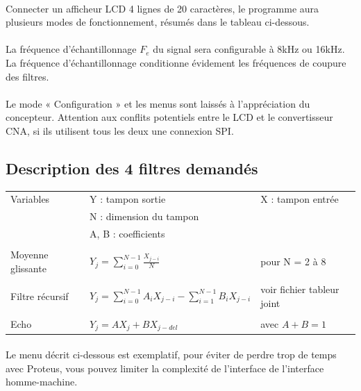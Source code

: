 \documentclass{article}
\begin{document}
    \paragraph{}
    Connecter un afficheur LCD 4 lignes de 20 caractères, le programme aura plusieurs modes de fonctionnement, résumés dans le tableau ci-dessous.

    \paragraph{}
    La fréquence d’échantillonnage $F_e$ du signal sera configurable à 8kHz ou 16kHz. La fréquence d’échantillonnage conditionne évidement les fréquences de coupure des filtres.

    \paragraph{}
    Le mode « Configuration » et les menus sont laissés à l’appréciation du concepteur. Attention aux conflits potentiels entre le LCD et le convertisseur CNA, si ils utilisent tous les deux une connexion SPI.

    \subsection{Description des 4 filtres demandés}

    \begin{tabular}{l l l}
        Variables           & Y : tampon sortie & X : tampon entrée \\
                            & N : dimension du tampon & \\
                            & A, B : coefficients & \\
                            & & \\
        Moyenne glissante   & $Y_j = \sum\limits_{i=0}^{N-1} \frac{X_{j-i}}{N}$ & pour N = 2 à 8 \\
                            & & \\
        Filtre récursif     & $Y_j = \sum\limits_{i=0}^{N-1} A_i X_{j-i} - \sum\limits_{i=1}^{N-1} B_i X_{j-i}$ & voir fichier tableur joint \\
                            & & \\
        Echo                &  $Y_j = A X_j + B X_{j-del}$ & avec $A + B = 1$ \\
    \end{tabular}

    \paragraph{}
    Le menu décrit ci-dessous est exemplatif, pour éviter de perdre trop de temps avec Proteus, vous pouvez limiter la complexité de l’interface de l’interface homme-machine.
\end{document}
